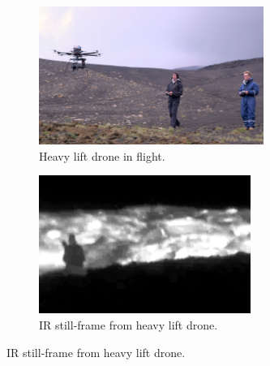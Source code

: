 \begin{figure}
    \centering
        \begin{subfigure}[b]{0.48\textwidth}
        \centering
        \includegraphics[height=4.5cm]{images/ir_drone_in_flight}
        \caption{Heavy lift drone in flight.}
        \label{figure:ir_drone_in_flight}
    \end{subfigure}
        \begin{subfigure}[b]{0.48\textwidth}
        \centering
        \includegraphics[height=4.5cm]{images/ir_drone_ir_stillframe}
        \caption{IR still-frame from heavy lift drone.}
        \label{figure:ir_drone_stillframe}
    \end{subfigure}
\end{figure}